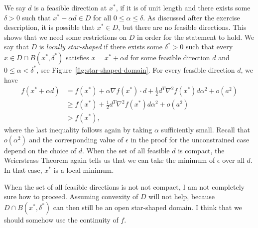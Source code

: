 \documentclass[a4paper]{article}
\begin{document}
We say $d$ is a feasible direction at $x^{*}$, if it is of unit length and there
exists some $\delta > 0$ such that $x^{*} + \alpha d \in D$ for all
$0 \leq \alpha \leq \delta$. As discussed after the exercise description, it is
possible that $x^{*} \in D$, but there are no feasible directions. This shows
that we need some restrictions on $D$ in order for the statement to hold. We say
that $D$ is \textit{locally star-shaped} if there exists some $\delta^{*} > 0$
such that every $x \in D \cap B(x^{*}, \delta^{*})$ satisfies
$x = x^{*} + \alpha d$ for some feasible direction $d$ and
$0 \leq \alpha < \delta^{*}$, see Figure~\ref{fig:star-shaped-domain}.
%
For every feasible direction $d$, we have
\begin{align*}
  f(x^{*} + \alpha d) &= f(x^{*}) + \alpha \nabla f(x^{*}) \cdot d + \frac{1}{2}d^{T}\nabla^{2}f(x^{*})d \alpha^{2} + o(a^{2}) \\
  &\geq f(x^{*}) + \frac{1}{2}d^{T}\nabla^{2}f(x^{*})d \alpha^{2} + o(a^{2}) \\
  &> f(x^{*}) ,
\end{align*}
where the last inequality follows again by taking $\alpha$ sufficiently small.
%
Recall that $o(\alpha^{2})$ and the corresponding value of $\epsilon$ in the
proof for the unconstrained case depend on the choice of $d$. When the set of
all feasible $d$ is compact, the Weierstrass Theorem again tells us that we can
take the minimum of $\epsilon$ over all $d$.
%
In that case, $x^{*}$ is a local minimum.

When the set of all feasible directions is not not compact, I am not completely
sure how to proceed. Assuming convexity of $D$ will not help, because
$D \cap B(x^{*}, \delta^{*})$ can then still be an open star-shaped domain.
I think that we should somehow use the continuity of $f$.
\end{document}
